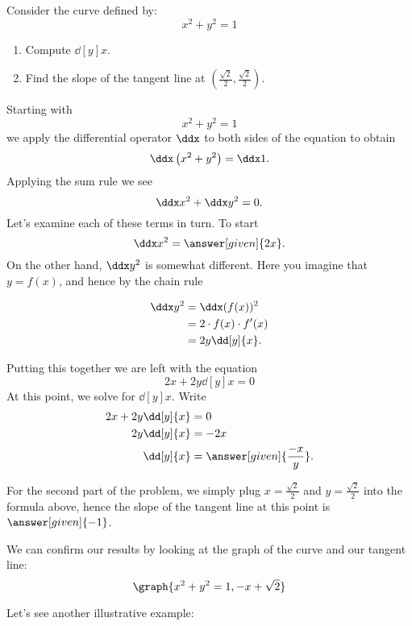 \documentclass{ximera}
\begin{document}
\begin{example}
Consider the curve defined by:
\[
x^2 + y^2 = 1
\]
\begin{enumerate}
\item Compute $\dd[y]{x}$.
\item Find the slope of the tangent line at $\left(\frac{\sqrt{2}}{2},\frac{\sqrt{2}}{2}\right)$.
\end{enumerate}
\begin{explanation}
  Starting with 
\[
x^2 + y^2 = 1
\]
we apply the differential operator $\ddx$ to both sides of the
equation to obtain
\[
\ddx \left(x^2+y^2\right) = \ddx 1.
\]
Applying the sum rule we see
\[
\ddx x^2+\ddx y^2 = 0.
\]
Let's examine each of these terms in turn. To start
\[
\ddx x^2 = \answer[given]{2x}.
\]
On the other hand, $\ddx y^2$ is somewhat different. Here you imagine that $y = f(x)$, and hence by the chain rule

\begin{align*}
\ddx y^2 &= \ddx (f(x))^2 \\
 &= 2\cdot f(x) \cdot f'(x) \\
 &= 2y\dd[y]{x}.
\end{align*}

Putting this together we are left with the equation
\[
2x + 2y\dd[y]{x} =0
\]
At this point, we solve for $\dd[y]{x}$. Write
\begin{align*}
2x + 2y\dd[y]{x} &= 0\\
2y \dd[y]{x} &= -2x\\
\dd[y]{x} &= \answer[given]{\frac{-x}{y}}.
\end{align*}

For the second part of the problem, we simply plug $x=\frac{\sqrt{2}}{2}$ and $y=\frac{\sqrt{2}}{2}$
into the formula above, hence the slope of the tangent line at this point 
is $\answer[given]{-1}$.
\begin{prompt}
  We can confirm our results by looking at the graph of the curve and
  our tangent line:
  \[
  \graph{x^2+y^2=1,-x+\sqrt{2}}
  \]
\end{prompt}
\end{explanation}
\end{example}

Let's see another illustrative example:
\end{document}
